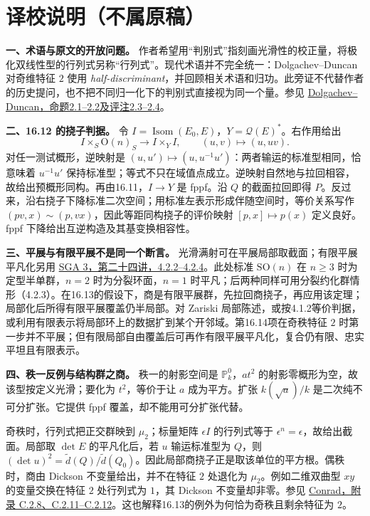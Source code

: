 \documentclass[openany,fontset=fandol]{ctexbook}
\newcommand{\Qsp}{\mathcal Q}
\DeclareMathOperator{\Isom}{Isom}
\begin{document}
\section*{译校说明（不属原稿）}
\noindent\textbf{一、术语与原文的开放问题。}
作者希望用“判别式”指刻画光滑性的校正量，将极化双线性型的行列式另称“行列式”。现代术语并不完全统一：Dolgachev--Duncan 对奇维特征 $2$ 使用 \emph{half-discriminant}，并回顾相关术语和归功。此旁证不代替作者的历史提问，也不把不同归一化下的判别式直接视为同一个量。参见 \href{https://doi.org/10.2140/ant.2018.12.99}{Dolgachev--Duncan，命题2.1--2.2及评注2.3--2.4}。

\medskip
\noindent\textbf{二、16.12 的挠子判据。}
令 $I=\Isom(E_0,E)$，$Y=\Qsp(E)^*$。右作用给出
\[
 I\times_S \mathrm O(n)_S\longrightarrow I\times_Y I,
 \qquad (u,v)\longmapsto(u,uv).
\]
对任一测试概形，逆映射是 $(u,u')\mapsto(u,u^{-1}u')$：两者输运的标准型相同，恰意味着 $u^{-1}u'$ 保持标准型；等式不只在域值点成立。逆映射自然地与拉回相容，故给出预概形同构。再由16.11，$I\to Y$ 是 fppf。沿 $Q$ 的截面拉回即得 $P$。反过来，沿右挠子下降标准二次空间；用标准左表示形成伴随空间时，等价关系写作 $(pv,x)\sim(p,vx)$，因此等距同构挠子的评价映射 $[p,x]\mapsto p(x)$ 定义良好。fppf 下降给出互逆构造及其基变换相容性。

\medskip
\newpage
\noindent\textbf{三、平展与有限平展不是同一个断言。}
光滑满射可在平展局部取截面；有限平展平凡化另用 \href{https://grothendiecksga.com/read/sga3/fr/XXIV-4.html}{SGA 3，第二十四讲，4.2.2--4.2.4}。此处标准 $\mathrm{SO}(n)$ 在 $n\ge3$ 时为定型半单群，$n=2$ 时为分裂环面，$n=1$ 时平凡；后两种同样可用分裂约化群情形（4.2.3）。在16.13的假设下，商是有限平展群，先拉回商挠子，再应用该定理；局部化后所得有限平展覆盖仍半局部。对 Zariski 局部陈述，或按4.1.2等价判据，或利用有限表示将局部环上的数据扩到某个开邻域。第16.14项在奇秩特征 $2$ 时第一步并不平展；但有限局部自由覆盖后可再作有限平展平凡化，复合仍有限、忠实平坦且有限表示。

\medskip
\noindent\textbf{四、秩一反例与结构群之商。}
秩一的射影空间是 $\mathbb P^0_k$，$at^2$ 的射影零概形为空，故该型按定义光滑；要化为 $t^2$，等价于让 $a$ 成为平方。扩张 $k(\sqrt a)/k$ 是二次纯不可分扩张。它提供 fppf 覆盖，却不能用可分扩张代替。
\par
奇秩时，行列式把正交群映到 $\mu_2$；标量矩阵 $\epsilon I$ 的行列式等于 $\epsilon^n=\epsilon$，故给出截面。局部取 $\det E$ 的平凡化后，若 $u$ 输运标准型为 $Q$，则 $(\det u)^2=\widetilde d(Q)/\widetilde d(Q_0)$。因此局部商挠子正是取该单位的平方根。偶秩时，商由 Dickson 不变量给出，并不在特征 $2$ 处退化为 $\mu_2$。例如二维双曲型 $xy$ 的变量交换在特征 $2$ 处行列式为 $1$，其 Dickson 不变量却非零。参见 \href{https://math.stanford.edu/~conrad/papers/luminysga3.pdf}{Conrad，附录 C.2.8、C.2.11--C.2.12}。这也解释16.13的例外为何恰为奇秩且剩余特征为 $2$。
\end{document}
